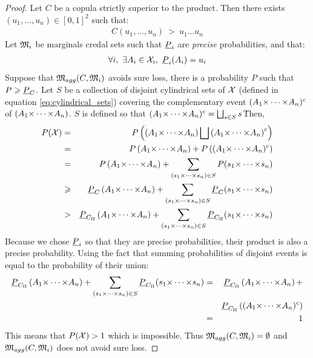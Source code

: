 \begin{proof}
    Let $C$ be a copula strictly superior to the product. Then there exists $(u_1,\dots,u_n)\in[0,1]^2$ such that:
    \begin{eqnarray*}
        C(u_1,\dots, u_n)~>~u_1\dots u_n
    \end{eqnarray*}
    Let ${\mathfrak{M}}_i$ be marginals credal sets such that ${\underline{P}}_i$ are \textit{precise} probabilities, and that:
    \begin{eqnarray*}
        \forall i,~\exists A_i\in{\mathcal{X}}_i,~{\underline{P}}_i(A_i)=u_i
    \end{eqnarray*}
    Suppose that ${\mathfrak{M}}_{agg}(C, {\mathfrak{M}}_i)$ avoids sure loss, \ie there is a probability $P$ such that $P\geqslant{\underline{P}}_C$. Let $S$ be a collection of disjoint cylindrical sets of ${\mathcal{X}}$ (defined in equation \eqref{eq:cylindrical_sets}) covering the complementary event $(A_1{\times\dots\times} A_n)^c$ of $(A_1{\times\dots\times} A_n)$. $S$ is defined so that $(A_1{\times\dots\times} A_n)^c=\bigsqcup_{s\in S}s$\.
    Then,
    \begin{eqnarray*}
        P({\mathcal{X}}) &=& P\left(\left(A_1{\times\dots\times} A_n\right)\bigsqcup\left(A_1{\times\dots\times} A_n\right)^c\right)\\
        &=& P\left(A_1{\times\dots\times} A_n\right)+P\left((A_1{\times\dots\times} A_n)^c\right)\\
        &=& P\left(A_1{\times\dots\times} A_n\right)+\sum_{(s_1{\times\dots\times} s_n)\in S}P(s_1{\times\dots\times} s_n)\\
        &\geqslant& {\underline{P}}_C\left(A_1{\times\dots\times} A_n\right)+\sum_{(s_1{\times\dots\times} s_n)\in S}{\underline{P}}_C(s_1{\times\dots\times} s_n)\\
        &>& {\underline{P}}_{C_\Pi}\left(A_1{\times\dots\times} A_n\right)+\sum_{(s_1{\times\dots\times} s_n)\in S}{\underline{P}}_{C_\Pi}(s_1{\times\dots\times} s_n)
    \end{eqnarray*}
    Because we chose ${\underline{P}}_i$ so that they are precise probabilities, their product is also a precise probability. Using the fact that summing probabilities of disjoint events is equal to the probability of their union:
    \begin{eqnarray*}
        {\underline{P}}_{C_\Pi}\left(A_1{\times\dots\times} A_n\right)+\sum_{(s_1{\times\dots\times} s_n)\in S}{\underline{P}}_{C_\Pi}(s_1{\times\dots\times} s_n) &=& {\underline{P}}_{C_\Pi}\left(A_1{\times\dots\times} A_n\right)+\\
        &&{\underline{P}}_{C_\Pi}\left((A_1{\times\dots\times} A_n)^c\right)\\
        &=& 1
    \end{eqnarray*}
    This means that $P({\mathcal{X}})>1$ which is impossible. Thus ${\mathfrak{M}}_{agg}(C, {\mathfrak{M}}_i)=\emptyset$ and ${\mathfrak{M}}_{agg}(C, {\mathfrak{M}}_i)$ does not avoid sure loss.
\end{proof}

